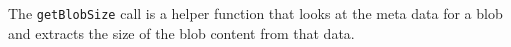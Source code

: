 The \verb+getBlobSize+ call is a helper function that looks at the meta data for a blob and extracts the
size of the blob content from that data.
